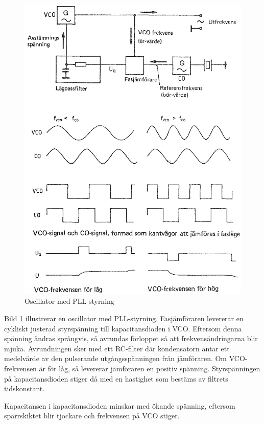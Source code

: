 \begin{figure}
  \includegraphics[width=\textwidth]{images/cropped_pdfs/bild_2_3-80b.pdf}
  \caption{Oscillator med PLL-styrning}
  \label{fig:BildII3-80b}
\end{figure}

Bild \ref{fig:BildII3-80b} illustrerar en oscillator med PLL-styrning.
Fasjämföraren levererar en cykliskt justerad styrspänning till
kapacitansdioden i VCO.
Eftersom denna spänning ändras språngvis, så avrundas förloppet så att
frekvensändringarna blir mjuka.
Avrundningen sker med ett RC-filter där kondensatorn antar ett medelvärde av den
pulserande utgångsspänningen från jämföraren.
Om VCO-frekvensen är för låg, så levererar jämföraren en positiv spänning.
Styrspänningen på kapacitansdioden stiger då med en hastighet som bestäms av
filtrets tidskonstant.

Kapacitansen i kapacitansdioden minskar med ökande spänning, eftersom
spärrskiktet blir tjockare och frekvensen på VCO stiger.

